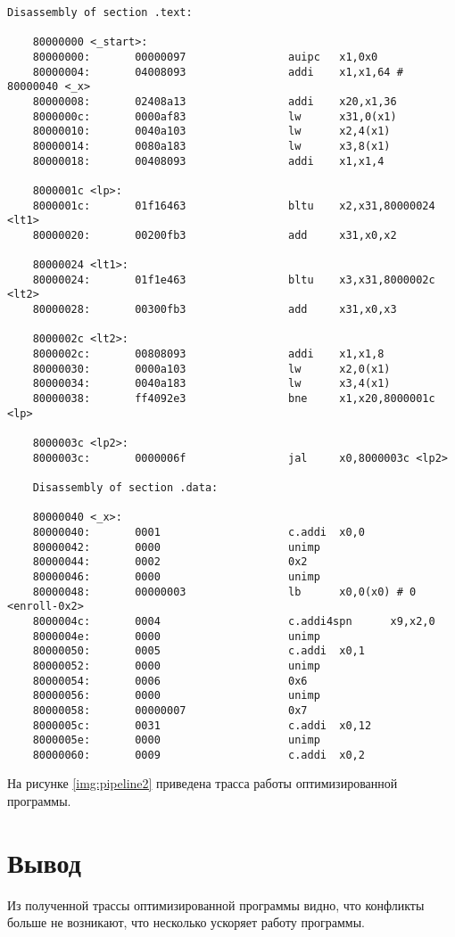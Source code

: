 \begin{lstlisting}[label=code:source_21, caption=Деассемблированный листинг оптимизированной программы]
	Disassembly of section .text:
	
	80000000 <_start>:
	80000000:       00000097                auipc   x1,0x0
	80000004:       04008093                addi    x1,x1,64 # 80000040 <_x>
	80000008:       02408a13                addi    x20,x1,36
	8000000c:       0000af83                lw      x31,0(x1)
	80000010:       0040a103                lw      x2,4(x1)
	80000014:       0080a183                lw      x3,8(x1)
	80000018:       00408093                addi    x1,x1,4
	
	8000001c <lp>:
	8000001c:       01f16463                bltu    x2,x31,80000024 <lt1>
	80000020:       00200fb3                add     x31,x0,x2
	
	80000024 <lt1>:
	80000024:       01f1e463                bltu    x3,x31,8000002c <lt2>
	80000028:       00300fb3                add     x31,x0,x3
	
	8000002c <lt2>:
	8000002c:       00808093                addi    x1,x1,8
	80000030:       0000a103                lw      x2,0(x1)
	80000034:       0040a183                lw      x3,4(x1)
	80000038:       ff4092e3                bne     x1,x20,8000001c <lp>
	
	8000003c <lp2>:
	8000003c:       0000006f                jal     x0,8000003c <lp2>
	
	Disassembly of section .data:
	
	80000040 <_x>:
	80000040:       0001                    c.addi  x0,0
	80000042:       0000                    unimp
	80000044:       0002                    0x2
	80000046:       0000                    unimp
	80000048:       00000003                lb      x0,0(x0) # 0 <enroll-0x2>
	8000004c:       0004                    c.addi4spn      x9,x2,0
	8000004e:       0000                    unimp
	80000050:       0005                    c.addi  x0,1
	80000052:       0000                    unimp
	80000054:       0006                    0x6
	80000056:       0000                    unimp
	80000058:       00000007                0x7
	8000005c:       0031                    c.addi  x0,12
	8000005e:       0000                    unimp
	80000060:       0009                    c.addi  x0,2
\end{lstlisting}

На рисунке \ref{img:pipeline2} приведена трасса работы оптимизированной программы.


\chapter*{Вывод}

Из полученной трассы оптимизированной программы видно, что конфликты больше не возникают, что несколько ускоряет работу программы.